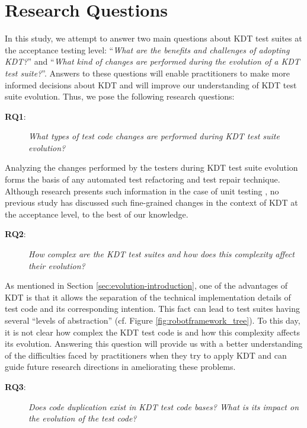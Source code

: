 \section{Research Questions}

In this study, we attempt to answer two main questions about KDT test suites at the acceptance testing level: ``\emph{What are the benefits and challenges of adopting KDT?}''  and ``\emph{What kind of changes are performed during the evolution of a KDT test suite?}''. Answers to these questions will enable practitioners to make more informed decisions about KDT and will improve our understanding of KDT test suite evolution. Thus, we pose the following research questions:

\begin{description}
\item[\textbf{RQ1}:] \emph{What types of test code changes are performed during KDT test suite evolution?}
\end{description}

Analyzing the changes performed by the testers during KDT test suite evolution forms the basis of any automated test refactoring and test repair technique. Although research presents such information in the case of unit testing \cite{Pinto2012}, no previous study has discussed such fine-grained changes in the context of KDT at the acceptance level, to the best of our
knowledge.

\begin{description}
\item[\textbf{RQ2}:] \emph{How complex are the KDT test suites and how does this complexity affect their evolution?}
\end{description}

As mentioned in Section \ref{sec:evolution-introduction}, one of the advantages of KDT is that it allows the separation of the technical implementation details of test code and its corresponding intention. This fact can lead to test suites having several ``levels of abstraction'' (cf. Figure \ref{fig:robotframework_tree}). To this day, it is not clear how complex the KDT test code is and how this complexity affects its evolution. Answering this question will provide us with a better understanding of the difficulties faced by practitioners when they try to apply KDT and can guide future research directions in ameliorating these problems.

\begin{description}
\item[\textbf{RQ3}:] \emph{Does code duplication exist in KDT test code bases? What is its impact on the evolution of the test code?}
\end{description}

